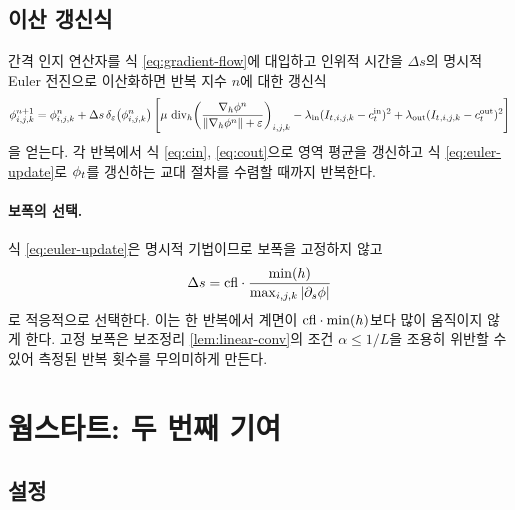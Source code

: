 
\subsection{이산 갱신식}

간격 인지 연산자를 식 \eqref{eq:gradient-flow}에 대입하고 인위적 시간을 $\Delta s$의
명시적 Euler 전진으로 이산화하면 반복 지수 $n$에 대한 갱신식
\begin{equation}
  \phi^{n+1}_{i,j,k} = \phi^{n}_{i,j,k}
  + \Delta s\,\delta_\varepsilon\bigl(\phi^n_{i,j,k}\bigr)\left[
    \mu\,\operatorname{div}_h\!\left(\frac{\nabla_h\phi^n}{\left\lVert \nabla_h\phi^n \right\rVert+\varepsilon}\right)_{i,j,k}
    - \lambda_{\mathrm{in}}(I_t{}_{,i,j,k}-c^{\mathrm{in}}_t)^2 + \lambda_{\mathrm{out}}(I_t{}_{,i,j,k}-c^{\mathrm{out}}_t)^2
  \right]
  \label{eq:euler-update}
\end{equation}
을 얻는다. 각 반복에서 식 \eqref{eq:cin}, \eqref{eq:cout}으로 영역 평균을 갱신하고
식 \eqref{eq:euler-update}로 $\phi_t$를 갱신하는 교대 절차를 수렴할 때까지 반복한다.

\paragraph{보폭의 선택.}
식 \eqref{eq:euler-update}은 명시적 기법이므로 보폭을 고정하지 않고
\begin{equation}
  \Delta s = \mathrm{cfl}\cdot \frac{\min(h)}{\max_{i,j,k}\left\lvert \partial_s \phi \right\rvert}
  \label{eq:cfl}
\end{equation}
로 적응적으로 선택한다. 이는 한 반복에서 계면이 $\mathrm{cfl}\cdot\min(h)$보다
많이 움직이지 않게 한다. 고정 보폭은 보조정리 \ref{lem:linear-conv}의 조건
$\alpha \le 1/L$을 조용히 위반할 수 있어 측정된 반복 횟수를 무의미하게 만든다.

\section{웜스타트: 두 번째 기여}
\label{sec:warmstart}

\subsection{설정}

